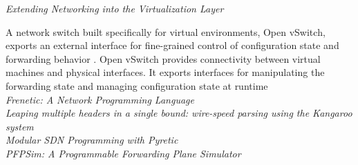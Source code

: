 \noindent \emph{Extending Networking into the Virtualization Layer}

A network switch built specifically for virtual environments, Open vSwitch,
exports an external interface
for fine-grained control of configuration state and forwarding behavior \cite{Pfaff2009}.
Open vSwitch provides
connectivity between virtual machines and physical interfaces. It exports
interfaces for manipulating
the forwarding state and managing configuration state at runtime  
\\

\noindent \emph{Frenetic: A Network Programming Language} 
\cite{Foster:2011:FNP:2034773.2034812}\\

\noindent \emph{Leaping multiple headers in a single bound: wire-speed parsing using the Kangaroo system}
\cite{Kozanitis:2010:LMH:1833515.1833654}\\


\noindent \emph{Modular SDN Programming with Pyretic}
\cite{Reich_modularsdn} \\

\noindent \emph{PFPSim: A Programmable Forwarding Plane Simulator} 

\cite{Abdi:2016:PPF:2881025.2881029}\\




